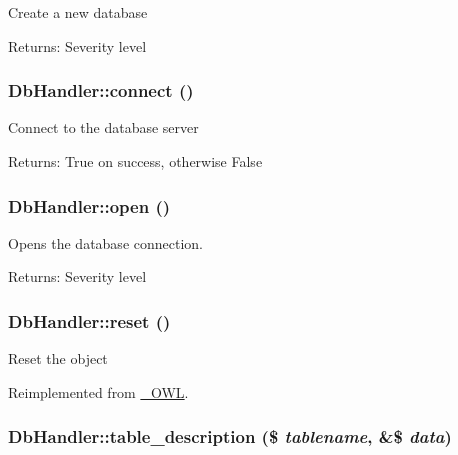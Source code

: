 Create a new database

\begin{Desc}
\item[Returns:]Severity level \end{Desc}
\hypertarget{classDbHandler_9cf52ba614981a0082063d57290d3b7c}{
\subsubsection{\setlength{\rightskip}{0pt plus 5cm}DbHandler::connect ()}}
\label{classDbHandler_9cf52ba614981a0082063d57290d3b7c}


Connect to the database server

\begin{Desc}
\item[Returns:]True on success, otherwise False \end{Desc}
\hypertarget{classDbHandler_fccbfc69ead84f8445116e050d1cfc2d}{
\subsubsection{\setlength{\rightskip}{0pt plus 5cm}DbHandler::open ()}}
\label{classDbHandler_fccbfc69ead84f8445116e050d1cfc2d}


Opens the database connection.

\begin{Desc}
\item[Returns:]Severity level \end{Desc}
\hypertarget{classDbHandler_9982df4830f05803935bb31bac7fae3d}{
\subsubsection{\setlength{\rightskip}{0pt plus 5cm}DbHandler::reset ()}}
\label{classDbHandler_9982df4830f05803935bb31bac7fae3d}


Reset the object 

Reimplemented from \hyperlink{class__OWL_2f2a042bcf31965194c03033df0edc9b}{\_\-OWL}.\hypertarget{classDbHandler_00402b0e3e677108716714fbf94bea40}{
\subsubsection{\setlength{\rightskip}{0pt plus 5cm}DbHandler::table\_\-description (\$ {\em tablename}, \&\$ {\em data})}}
\label{classDbHandler_00402b0e3e677108716714fbf94bea40}


